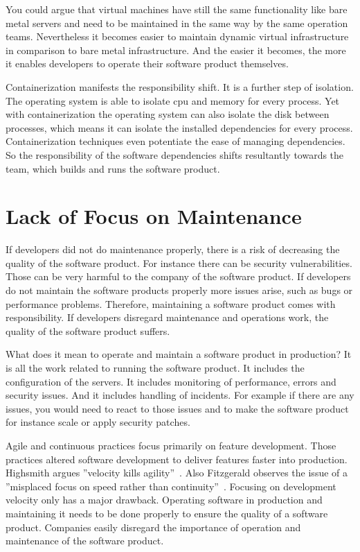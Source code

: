 You could argue that virtual machines have still the same functionality like bare metal
servers and need to be maintained in the same way by the same operation
teams. Nevertheless it becomes easier to maintain dynamic virtual
infrastructure~\cite{infra_as_code_platforms} in comparison to bare metal
infrastructure. And the easier it becomes, the more it enables developers to operate their
software product themselves.

Containerization manifests the responsibility shift. It is a further step of
isolation. The operating system is able to isolate cpu and memory for every process. Yet
with containerization the operating system can also isolate the disk between processes,
which means it can isolate the installed dependencies for every process. Containerization
techniques even potentiate the ease of managing dependencies. So the responsibility of the
software dependencies shifts resultantly towards the team, which builds and runs the
software product.


\section{Lack of Focus on Maintenance}

If developers did not do maintenance properly, there is a risk of decreasing the quality
of the software product. For instance there can be security vulnerabilities. Those can be
very harmful to the company of the software product. If developers do not maintain the
software products properly more issues arise, such as bugs or performance
problems. Therefore, maintaining a software product comes with responsibility. If
developers disregard maintenance and operations work, the quality of the software product
suffers.

What does it mean to operate and maintain a software product in production? It is all the
work related to running the software product. It includes the configuration of the
servers. It includes monitoring of performance, errors and security issues. And it
includes handling of incidents. For example if there are any issues, you would need to
react to those issues and to make the software product for instance scale or apply
security patches.

Agile and continuous practices focus primarily on feature development. Those practices
altered software development to deliver features faster into production. Highsmith argues
”velocity kills agility”~\cite{velocity_kills}. Also Fitzgerald observes the issue of a
”misplaced focus on speed rather than continuity”~\cite{continuous_fitzgerald}. Focusing
on development velocity only has a major drawback. Operating software in production and
maintaining it needs to be done properly to ensure the quality of a software
product. Companies easily disregard the importance of operation and maintenance of the
software product.



